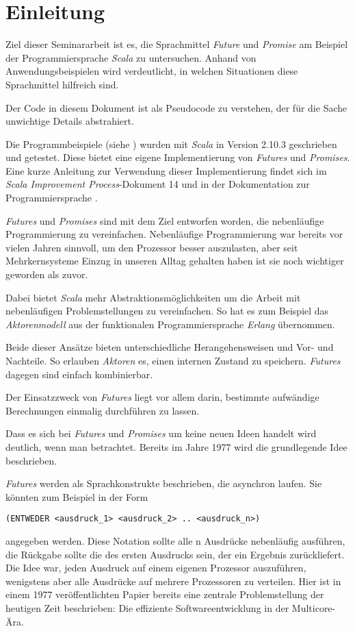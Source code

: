\section{Einleitung}

Ziel dieser Seminararbeit ist es, die Sprachmittel \emph{Future}
und \emph{Promise} am Beispiel der Programmiersprache \emph{Scala}
zu untersuchen. Anhand von Anwendungsbeispielen wird verdeutlicht, 
in welchen Situationen diese Sprachmittel hilfreich sind.

Der Code in diesem Dokument ist als Pseudocode zu verstehen, der für die
Sache unwichtige Details abstrahiert.

Die Programmbeispiele (siehe \cite{code}) wurden mit
\emph{Scala} in Version 2.10.3 geschrieben und getestet. Diese bietet
eine eigene Implementierung von \emph{Futures} und \emph{Promises}.
Eine kurze Anleitung zur Verwendung dieser Implementierung findet sich im
\emph{Scala Improvement Process}-Dokument 14 \cite{sip14}
und in der Dokumentation zur Programmiersprache \cite{scalaDokuFP}.

\emph{Futures} und \emph{Promises} sind mit dem Ziel entworfen worden,
die nebenläufige Programmierung zu vereinfachen. Nebenläufige Programmierung
war bereits vor vielen Jahren sinnvoll, um den Prozessor besser auszulasten,
aber seit Mehrkernsysteme Einzug in unseren Alltag gehalten haben
ist sie noch wichtiger geworden als zuvor.

Dabei bietet \emph{Scala} mehr Abstraktionsmöglichkeiten um die Arbeit
mit nebenläufigen Problemstellungen zu vereinfachen. So hat es zum
Beispiel das \emph{Aktorenmodell} aus der funktionalen Programmiersprache
\emph{Erlang} übernommen.

Beide dieser Ansätze bieten unterschiedliche Herangehensweisen und
Vor- und Nachteile. So erlauben \emph{Aktoren} es, einen internen Zustand
zu speichern. \emph{Futures} dagegen sind einfach kombinierbar.

Der Einsatzzweck von \emph{Futures} liegt vor allem darin, bestimmte
aufwändige Berechnungen einmalig durchführen zu lassen.

Dass es sich bei \emph{Futures} und \emph{Promises} um keine neuen
Ideen handelt wird deutlich, wenn man \cite{Baker:1977:IGC:872734.806932}
betrachtet. Bereits im Jahre 1977 wird die grundlegende Idee beschrieben.

\emph{Futures} werden als Sprachkonstrukte beschrieben, die asynchron laufen. Sie 
könnten zum Beispiel in der Form 
\begin{lstlisting}
(ENTWEDER <ausdruck_1> <ausdruck_2> .. <ausdruck_n>)
\end{lstlisting}
angegeben werden. Diese Notation sollte alle n Ausdrücke nebenläufig ausführen, 
die Rückgabe sollte die des ersten Ausdrucks sein, der ein Ergebnis zurückliefert.
Die Idee war, jeden Ausdruck auf einem eigenen Prozessor auszuführen, 
wenigstens aber alle Ausdrücke auf mehrere Prozessoren zu verteilen. Hier ist in 
einem 1977 veröffentlichten Papier bereits eine zentrale Problemstellung der 
heutigen Zeit beschrieben: Die effiziente Softwareentwicklung in der Multicore-Ära.

